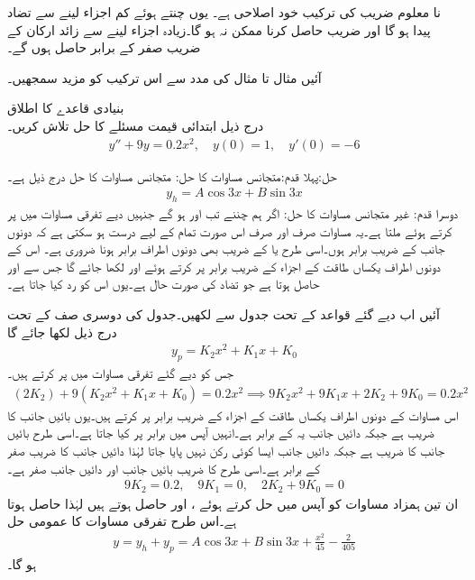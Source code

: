نا معلوم  ضریب  کی  ترکیب خود اصلاحی ہے۔ یوں  چنتے ہوئے کم اجزاء لینے سے تضاد پیدا ہو گا اور  ضریب  حاصل کرنا ممکن نہ ہو گا۔زیادہ اجزاء لینے سے زائد ارکان کے  ضریب  صفر کے برابر حاصل ہوں گے۔

آئیں مثال  تا مثال  کی مدد سے اس ترکیب کو مزید سمجھیں۔

 \quad بنیادی قاعدے کا اطلاق\\
درج ذیل ابتدائی قیمت مسئلے کا حل تلاش کریں۔
\begin{align*}
y''+9 y=0.2x^2, \quad y(0)=1, \quad y'(0)=-6
\end{align*}

حل:پہلا قدم:متجانس مساوات کا حل: \quad متجانس مساوات  کا حل   درج ذیل ہے۔
\begin{align*}
y_h=A\cos 3 x+B\sin 3 x
\end{align*}
دوسرا قدم: غیر متجانس مساوات کا حل: \quad اگر ہم  چننے تب  اور  ہو گے جنہیں دیے تفرقی مساوات میں پر کرتے ہوئے   ملتا ہے۔یہ مساوات صرف اور صرف اس صورت تمام  کے لیے درست ہو سکتی ہے کہ دونوں جانب  کے  ضریب  برابر ہوں۔اسی طرح  یا  کے  ضریب  بھی دونوں اطراف برابر ہونا ضروری ہے۔ اس کے دونوں اطراف یکساں طاقت کے اجزاء کے  ضریب  برابر پر کرتے ہوئے  اور  لکھا جائے گا جس سے  اور  حاصل ہوتا ہے جو تضاد کی صورت حال ہے۔یوں اس  کو رد کیا جاتا ہے۔

آئیں اب دیے گئے قواعد کے تحت  جدول  سے  لکھیں۔جدول کی دوسری صف کے تحت درج ذیل لکھا جائے گا
\begin{align*}
y_p=K_2x^2+K_1x+K_0
\end{align*}
جس کو دیے گئے تفرقی مساوات میں پر کرتے ہیں۔
\begin{align*}
(2K_2)+9(K_2x^2+K_1x+K_0)=0.2x^2 \implies 9K_2 x^2 +9K_1x+2K_2+9K_0=0.2x^2
\end{align*}
اس مساوات کے دونوں اطراف یکساں طاقت کے اجزاء کے  ضریب  برابر پر کرتے ہیں۔یوں بائیں جانب  کا  ضریب   ہے جبکہ دائیں جانب یہ  کے برابر ہے۔انہیں آپس میں برابر پر کیا جاتا ہے۔اسی طرح بائیں جانب  کا  ضریب   ہے جبکہ دائیں جانب ایسا کوئی رکن نہیں پایا جاتا لہٰذا دائیں جانب  کا  ضریب  صفر کے برابر ہے۔اسی طرح  کا  ضریب  بائیں جانب  اور دائیں جانب صفر ہے۔
\begin{align*}
9K_2=0.2, \quad  9K_1=0, \quad 2K_2+9K_0=0
\end{align*}
ان تین ہمزاد مساوات کو آپس میں حل کرتے ہوئے ،  اور  حاصل ہوتے ہیں لہٰذا 
 حاصل ہوتا ہے۔اس طرح تفرقی مساوات کا عمومی حل 
\begin{align*}
y=y_h+y_p=A\cos 3 x+B\sin 3 x+\frac{x^2}{45}-\frac{2}{405}
\end{align*}
ہو گا۔


